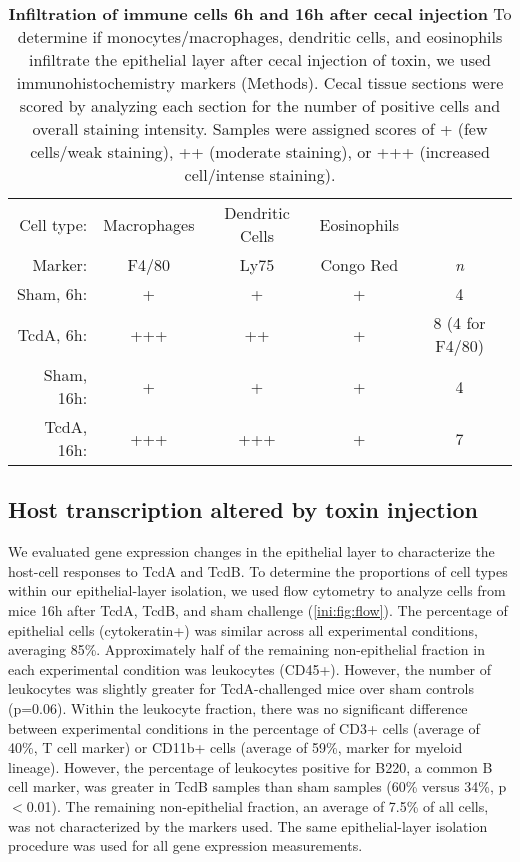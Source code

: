 \begin{table}[ht]
\centering
\begin{tabular}{ r c c c c }
  Cell type: & Macrophages & Dendritic Cells & Eosinophils &  \\
  Marker: & F4/80 & Ly75 & Congo Red & \emph{n}\\ \hline
  Sham, 6h: & + & + & + & 4 \\
  TcdA, 6h: & +++ & ++ & + & 8 (4 for F4/80) \\
  Sham, 16h: & + & + & + & 4 \\
  TcdA, 16h: & +++ & +++ & + & 7 \\
\end{tabular}
\caption[Infiltration of immune cells 6h and 16h after cecal injection]
          {\textbf{Infiltration of immune cells 6h and 16h after cecal injection}
          To determine if monocytes/macrophages, dendritic cells, and eosinophils
infiltrate the epithelial layer after cecal injection of toxin, we used
immunohistochemistry markers (Methods). Cecal tissue sections were scored 
by analyzing each section for the number of positive cells and overall
staining intensity.  Samples were assigned scores of + (few cells/weak staining), 
++ (moderate staining), or +++ (increased cell/intense staining).
          }
\label{ini:tab:ihc}
\end{table}


\subsection{ Host transcription altered by toxin injection }
We evaluated gene expression changes in the epithelial layer to 
characterize the host-cell responses to TcdA and TcdB. To determine 
the proportions of cell types within our epithelial-layer isolation, 
we used flow cytometry to analyze cells from mice 16h after TcdA, TcdB, 
and sham challenge (\autoref{ini:fig:flow}). The percentage of epithelial 
cells (cytokeratin+) was similar across all experimental conditions, 
averaging 85\%. Approximately half of the remaining non-epithelial 
fraction in each experimental condition was leukocytes (CD45+). However, 
the number of leukocytes was slightly greater for TcdA-challenged mice 
over sham controls (p=0.06). Within the leukocyte fraction, there was 
no significant difference between experimental conditions in the 
percentage of CD3+ cells (average of 40\%, T cell marker) or CD11b+ 
cells (average of 59\%, marker for myeloid lineage). However, the 
percentage of leukocytes positive for B220, a common B cell marker, 
was greater in TcdB samples than sham samples (60\% versus 34\%, 
p$<$0.01). The remaining non-epithelial fraction, an average of 7.5\% 
of all cells, was not characterized by the markers used. The same 
epithelial-layer isolation procedure was used for all gene expression 
measurements.

